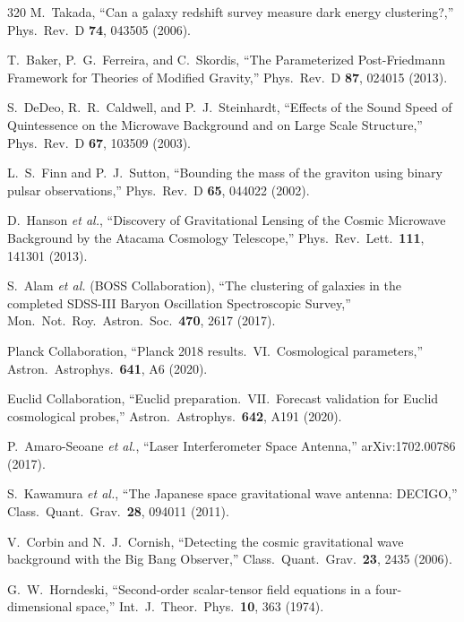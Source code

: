 \begin{thebibliography}{320}
M.~Takada,
``Can a galaxy redshift survey measure dark energy clustering?,''
Phys.\ Rev.\ D \textbf{74}, 043505 (2006).

T.~Baker, P.~G.~Ferreira, and C.~Skordis,
``The Parameterized Post-Friedmann Framework for Theories of Modified Gravity,''
Phys.\ Rev.\ D \textbf{87}, 024015 (2013).

S.~DeDeo, R.~R.~Caldwell, and P.~J.~Steinhardt,
``Effects of the Sound Speed of Quintessence on the Microwave Background and on Large Scale Structure,''
Phys.\ Rev.\ D \textbf{67}, 103509 (2003).

L.~S.~Finn and P.~J.~Sutton,
``Bounding the mass of the graviton using binary pulsar observations,''
Phys.\ Rev.\ D \textbf{65}, 044022 (2002).

D.~Hanson \emph{et al.},
``Discovery of Gravitational Lensing of the Cosmic Microwave Background by the Atacama Cosmology Telescope,''
Phys.\ Rev.\ Lett.\ \textbf{111}, 141301 (2013).

S.~Alam \emph{et al.} (BOSS Collaboration),
``The clustering of galaxies in the completed SDSS-III Baryon Oscillation Spectroscopic Survey,''
Mon.\ Not.\ Roy.\ Astron.\ Soc.\ \textbf{470}, 2617 (2017).

Planck Collaboration,
``Planck 2018 results.\ VI.\ Cosmological parameters,''
Astron.\ Astrophys.\ \textbf{641}, A6 (2020).

Euclid Collaboration,
``Euclid preparation.\ VII.\ Forecast validation for Euclid cosmological probes,''
Astron.\ Astrophys.\ \textbf{642}, A191 (2020).

P.~Amaro-Seoane \emph{et al.},
``Laser Interferometer Space Antenna,''
arXiv:1702.00786 (2017).

S.~Kawamura \emph{et al.},
``The Japanese space gravitational wave antenna: DECIGO,''
Class.\ Quant.\ Grav.\ \textbf{28}, 094011 (2011).

V.~Corbin and N.~J.~Cornish,
``Detecting the cosmic gravitational wave background with the Big Bang Observer,''
Class.\ Quant.\ Grav.\ \textbf{23}, 2435 (2006).

G.~W.~Horndeski,
``Second-order scalar-tensor field equations in a four-dimensional space,''
Int.\ J.\ Theor.\ Phys.\ \textbf{10}, 363 (1974).


\end{thebibliography}
